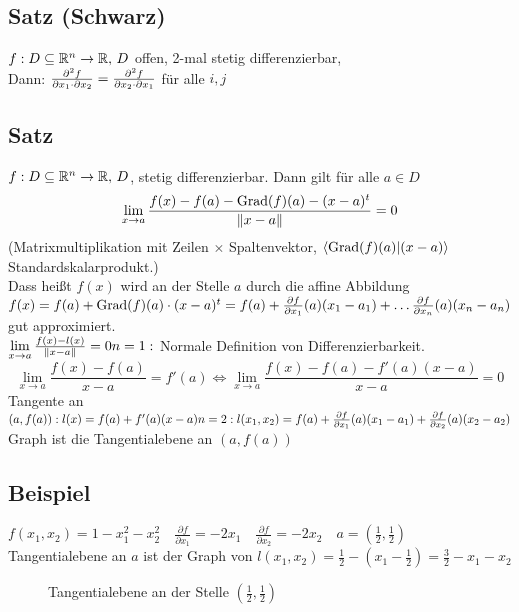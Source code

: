 \subsection{Satz (Schwarz)}\label{sec:\thesubsection}
$f : D \subseteq \mathbb{R}^n \to \mathbb{R},\, D$ offen, 2-mal stetig differenzierbar,\\
Dann: $\frac{\partial^2 f}{\partial x_1 \cdot \partial x_2} = \frac{\partial^2 f}{\partial x_2 \cdot \partial x_1}$ für alle $i,j$
\subsection{Satz}\label{sec:\thesubsection}
$f : D \subseteq \mathbb{R}^n \to \mathbb{R},\, D$, stetig differenzierbar. Dann gilt für alle $a \in D$
\[ \lim_{x\to a} \frac{f(x) - f(a) - \operatorname{Grad}(f)(a) - (x-a)^t}{\Vert x-a\Vert} = 0 \]
(Matrixmultiplikation mit Zeilen $\times$ Spaltenvektor, $\langle \operatorname{Grad}(f)(a)| (x-a)\rangle$ Standardskalarprodukt.)\\
Dass hei\ss t $f(x)$ wird an der Stelle $a$ durch die affine Abbildung $f(x) = f(a) + \operatorname{Grad}(f)(a) \cdot (x-a)^t = f(a) + \frac{\partial f}{\partial x_1}(a) (x_1 -a_1) + \ldots \frac{\partial f}{\partial x_n}(a) (x_n -a_n)$ gut approximiert.\\
$\lim\limits_{x\to a} \frac{f(x) -l(x)}{\Vert x-a\Vert} = 0\\
n= 1:$ Normale Definition von Differenzierbarkeit.
\[\lim_{x \to a} \frac{f(x) - f(a)}{x-a} = f'(a) \Leftrightarrow \lim_{x \to a} \frac{f(x) - f(a)-f'(a)(x-a)}{x-a} = 0 \]
Tangente an $(a,f(a)): l(x) = f(a) + f'(a)(x-a)\\
n = 2: l(x_1,x_2) = f(a) + \frac{\partial f}{\partial x_1}(a) (x_1 - a_1) + \frac{\partial f}{\partial x_2}(a) (x_2 -a_2)$
Graph ist die Tangentialebene an $(a,f(a))$
\subsection{Beispiel}\label{sec:\thesubsection}
\(f(x_1,x_2) = 1 - x^2_1 - x^2_2 \quad \frac{\partial f}{\partial x_1} = -2x_1\quad \frac{\partial f}{\partial x_2} = -2x_2 \quad a = \left(\frac12,\frac12\right)\)\\
Tangentialebene an $a$ ist der Graph von \(l(x_1,x_2) = \frac12 - (x_1 - \frac12) = \frac32 - x_1 - x_2 \)
\begin{figure}[h!]
\centering
{}
\caption{Tangentialebene an der Stelle $(\frac12,\frac12)$}
\end{figure}
